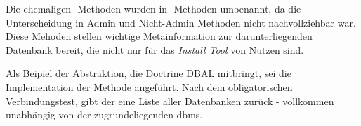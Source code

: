 Die ehemaligen -Methoden wurden in -Methoden umbenannt, da die Unterscheidung in Admin und Nicht-Admin Methoden nicht nachvollziehbar war. Diese Mehoden stellen wichtige Metainformation zur darunterliegenden Datenbank bereit, die nicht nur für das \textit{Install Tool} von Nutzen sind.

Als Beipiel der Abstraktion, die Doctrine DBAL mitbringt, sei die Implementation der Methode  angeführt. Nach dem obligatorischen Verbindungstest, gibt der  eine Liste aller Datenbanken zurück - vollkommen unabhängig von der zugrundeliegenden \gls{dbms}.


